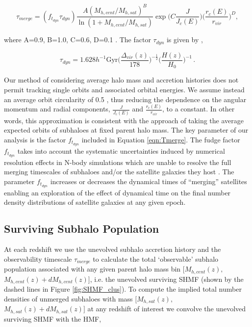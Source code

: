 \begin{equation}
\label{eqn:Tmerge}
\tau_{merge} =
(f_{t_{dyn}}\tau_{dyn}) \frac{A(M_{h, cent}/M_{h,sat})^B}{\ln(1+M_{h, cent}/M_{h, sat})} \exp \Big(C\frac{J}{J_c(E)}\Big) \Big( \frac{r_c(E)}{r_{vir}} \Big)^D,
\end{equation}

where A=0.9, B=1.0, C=0.6, D=0.1 \citep{McCavana2012TheMergers}. The factor $\tau_{dyn}$ is given by \citep{Jiang2016StatisticsFunctions},

\begin{equation}
\label{eqn:tdyn}
\tau_{dyn} = 1.628 h^{-1} \mathrm{Gyr} \Big(\frac{\Delta_{vir}(z)}{178}\Big)^{-\frac{1}{2}} \Big(\frac{H(z)}{H_0}\Big)^{-1} \, .
\end{equation}

Our method of considering average halo mass and accretion histories does not permit tracking single orbits and associated orbital energies. We assume instead an average orbit circularity of 0.5 \citep{Khochfar2006OrbitalHalos}, thus reducing the dependence on the angular momentum and radial components, $\frac{J}{J_c(E)}$ and $\frac{r_c(E)}{r_{vir}}$, to a constant. In other words, this approximation is consistent with the approach of taking the average expected orbits of subhaloes at fixed parent halo mass.
The key parameter of our analysis is the factor $f_{t_{dyn}}$ included in Equation \ref{eqn:Tmerge}.
The fudge factor $f_{t_{dyn}}$ takes into account the systematic uncertainties induced by numerical resolution effects in N-body simulations which are unable to resolve the full merging timescales of subhaloes and/or the satellite galaxies they host \citep{vandenBosch2018DisruptionFiction}. The parameter $f_{t_{dyn}}$ increases or decreases the dynamical times of  ``merging'' satellites enabling an exploration of the effect of dynamical time on the final number density distributions of satellite galaxies at any given epoch.

\subsection{Surviving Subhalo Population}
At each redshift we use the unevolved subhalo accretion history and the observability timescale $\tau_{merge}$ to calculate the total `observable' subhalo population associated with any given parent halo mass bin $[M_{h,cent}(z),$ $M_{h,cent}(z) + dM_{h,cent}(z)]$, i.e. the unevolved surviving SHMF (shown by the dashed lines in Figure \ref{fig:SHMF_clus}). To compute the implied total number densities of unmerged subhaloes with mass $[M_{h,sat}(z),$ $M_{h,sat}(z) + dM_{h,sat}(z)]$ at any redshift of interest we convolve the unevolved surviving SHMF with the HMF,

